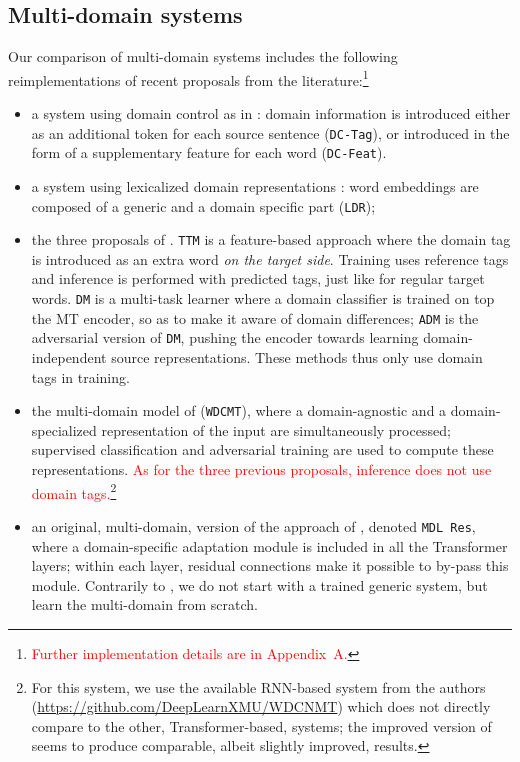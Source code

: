 \documentclass[11pt,a4paper]{article}
\newcommand{\fyDone}[1]{\done[FY]\Todo[FY:]{\textcolor{orange}{#1}}}
\newcommand{\revision}[1]{\textcolor{red}{#1}}
\newcommand{\system}[1]{\texttt{{#1}}}
\begin{document}
\subsection{Multi-domain systems \label{ssec:systems}}
\fyDone{Remove Gated residual}
Our comparison of multi-domain systems includes the following reimplementations of recent proposals from the literature:\footnote{\revision{Further implementation details are in Appendix~A.}}
\begin{itemize}
\item a system using domain control as in \cite{Kobus17domaincontrol}: domain information is introduced either as an additional token for each source sentence (\system{DC-Tag}), or introduced in the form of a supplementary feature for each word (\system{DC-Feat}).
\item a system using lexicalized domain representations \cite{Pham19generic}: word embeddings are composed of a generic and a domain specific part (\system{LDR});\fyDone{why not LDR as in Minh's paper?}
\item the three proposals of . \system{TTM} is a feature-based approach where the domain tag is introduced as an extra word \textsl{on the target side}. Training uses reference tags and inference is performed with predicted tags, just like for regular target words. \system{DM} is a multi-task learner where a domain classifier is trained on top the MT encoder, so as to make it aware of domain differences; \system{ADM} is the adversarial version of \system{DM}, pushing the encoder towards learning domain-independent source representations. These methods thus only use domain tags in training.
\item the multi-domain model of  (\system{WDCMT}), where a domain-agnostic and a domain-specialized representation of the input are simultaneously processed; supervised classification and adversarial training are used to compute these representations. \revision{As for the three previous proposals, inference does not use domain tags.}\footnote{For this system, we use the available RNN-based system from the authors (\url{https://github.com/DeepLearnXMU/WDCNMT}\fyDone{URLs}) which does not directly compare to the other, Transformer-based, systems; the improved version of \cite{Su19exploring} seems to produce comparable, albeit slightly improved, results.}\fyDone{Check this}
\item an original, multi-domain, version of the approach of , denoted \system{MDL Res}, where a domain-specific adaptation module is included in all the Transformer layers; within each layer, residual connections make it possible to by-pass this module.
Contrarily to \cite{Bapna19simple}, we do not start with a trained generic system, but learn the multi-domain from scratch.\fyDone{Check this.}
\end{itemize}
\end{document}
